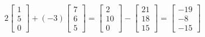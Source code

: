 \documentclass{article}
\begin{document}
\[
  2
    \begin{bmatrix}
      1 \\
      5 \\
      0
    \end{bmatrix}
  +
  (-3)
  \begin{bmatrix}
    7 \\
    6 \\
    5
  \end{bmatrix}
  =
  \begin{bmatrix}
    2 \\
    10 \\
    0
  \end{bmatrix}
  -
  \begin{bmatrix}
    21 \\
    18 \\
    15
  \end{bmatrix}
  =
  \begin{bmatrix}
    -19 \\
    -8 \\
    -15
  \end{bmatrix}
\]
\end{document}
